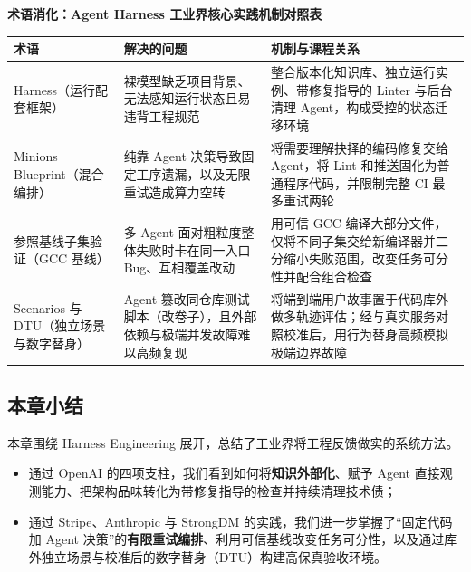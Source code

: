 \documentclass[UTF8,a4paper,11pt,fontset=fandol]{ctexart}
\begin{document}
\par{}\textbf{术语消化：Agent Harness 工业界核心实践机制对照表}

\begin{center}\small\begin{tabularx}{\linewidth}{YYY}

\toprule

术语 & 解决的问题 & 机制与课程关系\\\midrule

Harness（运行配套框架） & 裸模型缺乏项目背景、无法感知运行状态且易违背工程规范 & 整合版本化知识库、独立运行实例、带修复指导的 Linter 与后台清理 Agent，构成受控的状态迁移环境\\[3pt]

Minions Blueprint（混合编排） & 纯靠 Agent 决策导致固定工序遗漏，以及无限重试造成算力空转 & 将需要理解抉择的编码修复交给 Agent，将 Lint 和推送固化为普通程序代码，并限制完整 CI 最多重试两轮\\[3pt]

参照基线子集验证（GCC 基线） & 多 Agent 面对粗粒度整体失败时卡在同一入口 Bug、互相覆盖改动 & 用可信 GCC 编译大部分文件，仅将不同子集交给新编译器并二分缩小失败范围，改变任务可分性并配合组合检查\\[3pt]

Scenarios 与 DTU（独立场景与数字替身） & Agent 篡改同仓库测试脚本（改卷子），且外部依赖与极端并发故障难以高频复现 & 将端到端用户故事置于代码库外做多轨迹评估；经与真实服务对照校准后，用行为替身高频模拟极端边界故障\\[3pt]

\bottomrule\end{tabularx}\end{center}

\subsection{本章小结}

本章围绕 Harness Engineering 展开，总结了工业界将工程反馈做实的系统方法。

\begin{itemize}
\item 通过 OpenAI 的四项支柱，我们看到如何将\textbf{知识外部化}、赋予 Agent 直接观测能力、把架构品味转化为带修复指导的检查并持续清理技术债；

\item 通过 Stripe、Anthropic 与 StrongDM 的实践，我们进一步掌握了“固定代码加 Agent 决策”的\textbf{有限重试编排}、利用可信基线改变任务可分性，以及通过库外独立场景与校准后的数字替身（DTU）构建高保真验收环境。
\end{itemize}
\end{document}
